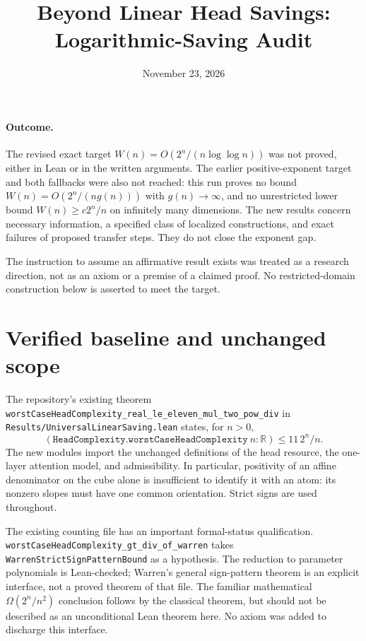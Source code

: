 \documentclass[11pt]{article}
\title{Beyond Linear Head Savings: Logarithmic-Saving Audit}
\author{}
\date{November 23, 2026}
\begin{document}
\maketitle

\paragraph{Outcome.}
The revised exact target
$W(n)=O(2^n/(n\log\log n))$ was not proved, either in Lean or in the
written arguments. The earlier positive-exponent target and both
fallbacks were also not reached: this run proves no bound
$W(n)=O(2^n/(n g(n)))$ with $g(n)\to\infty$, and no unrestricted
lower bound $W(n)\geq c2^n/n$ on infinitely many dimensions.
The new results concern necessary information, a specified class of
localized constructions, and exact failures of proposed transfer steps.
They do not close the exponent gap.

The instruction to assume an affirmative result exists was treated as
a research direction, not as an axiom or a premise of a claimed proof.
No restricted-domain construction below is asserted to meet the target.

\section{Verified baseline and unchanged scope}

The repository's existing theorem
\texttt{worstCaseHeadComplexity\_real\_le\_eleven\_mul\_two\_pow\_div}
in \texttt{Results/UniversalLinearSaving.lean} states, for $n>0$,
\[
 (\texttt{HeadComplexity.worstCaseHeadComplexity}\ n:\mathbb R)
 \leq 11\,2^n/n.
\]
The new modules import the unchanged definitions of the head resource,
the one-layer attention model, and admissibility. In particular,
positivity of an affine denominator on the cube alone is insufficient
to identify it with an atom: its nonzero slopes must have one common
orientation. Strict signs are used throughout.

The existing counting file has an important formal-status qualification.
\texttt{worstCaseHeadComplexity\_gt\_div\_of\_warren}
takes \texttt{WarrenStrictSignPatternBound} as a hypothesis.
The reduction to parameter polynomials is Lean-checked; Warren's
general sign-pattern theorem is an explicit interface, not a proved
theorem of that file. The familiar mathematical
$\Omega(2^n/n^2)$ conclusion follows by the classical theorem, but
should not be described as an unconditional Lean theorem here.
No axiom was added to discharge this interface.
\end{document}
